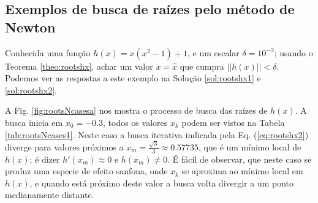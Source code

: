 \newpage
\subsection{Exemplos de busca de raízes pelo método de Newton}


\begin{example}\label{ex:rootshx1}
Conhecida uma função $h(x)=x(x^2-1)+1$, e um escalar $\delta=10^{-3}$;
usando o Teorema \ref{theo:rootshx}, 
achar um valor $x=\hat{x}$ que cumpra $||h(x)||<\delta$.
Podemos ver as respostas a este exemplo na Solução \ref{sol:rootshx1} e \ref{sol:rootshx2}.
\end{example}
\begin{SolutionT}\label{sol:rootshx1}
 A Fig. \ref{fig:rootsNcasesa} nos mostra o processo de busca das raízes de $h(x)$. 
A busca inicia em $x_0=-0.3$, 
todos os valores $x_{k}$ podem ser vistos na
Tabela \ref{tab:rootsNcases1}. 
Neste caso a busca iterativa indicada pela Eq. (\ref{eq:rootshx2}) 
diverge para valores próximos a $x_m=\frac{\sqrt{3}}{3}\approx 0.57735$,
que é um mínimo local de $h(x)$; é dizer $h'(x_m)\approx 0$ e $h(x_m)\neq 0$.
É fácil de observar, que neste caso se produz 
uma especie de efeito sanfona, onde $x_{k}$ se aproxima ao mínimo local em $h(x)$, e quando 
está próximo deste valor a busca volta divergir a um ponto medianamente distante.
\end{SolutionT}

